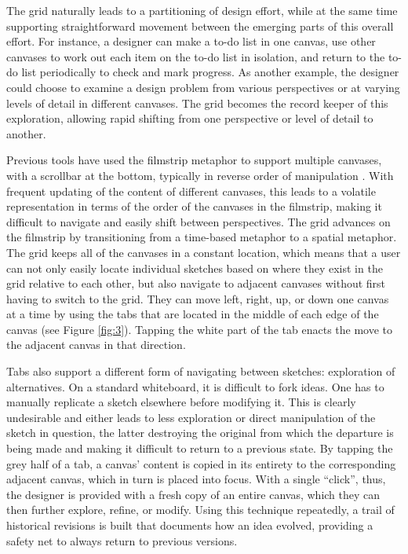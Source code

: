 The grid naturally leads to a partitioning of design effort, while at the same time supporting straightforward movement between the emerging parts of this overall effort. For instance, a designer can make a to-do list in one canvas, use other canvases to work out each item on the to-do list in isolation, and return to the to-do list periodically to check and mark progress. As another example, the designer could choose to examine a design problem from various perspectives or at varying levels of detail in different canvases. The grid becomes the record keeper of this exploration, allowing rapid shifting from one perspective or level of detail to another.

Previous tools have used the filmstrip metaphor to support multiple canvases, with a scrollbar at the bottom, typically in reverse order of manipulation \citep{Stefik}. With frequent updating of the content of different canvases, this leads to a volatile representation in terms of the order of the canvases in the filmstrip, making it difficult to navigate and easily shift between perspectives. The grid advances on the filmstrip by transitioning from a time-based metaphor to a spatial metaphor. The grid keeps all of the canvases in a constant location, which means that a user can not only easily locate individual sketches based on where they exist in the grid relative to each other, but also navigate to adjacent canvases without first having to switch to the grid. They can move left, right, up, or down one canvas at a time by using the tabs that are located in the middle of each edge of the canvas (see Figure \ref{fig:3}). Tapping the white part of the tab enacts the move to the adjacent canvas in that direction.

Tabs also support a different form of navigating between sketches: exploration of alternatives. On a standard whiteboard, it is difficult to fork ideas. One has to manually replicate a sketch elsewhere before modifying it. This is clearly undesirable and either leads to less exploration or direct manipulation of the sketch in question, the latter destroying the original from which the departure is being made and making it difficult to return to a previous state. By tapping the grey half of a tab, a canvas' content is copied in its entirety to the corresponding adjacent canvas, which in turn is placed into focus. With a single ``click'', thus, the designer is provided with a fresh copy of an entire canvas, which they can then further explore, refine, or modify. Using this technique repeatedly, a trail of historical revisions is built that documents how an idea evolved, providing a safety net to always return to previous versions.

